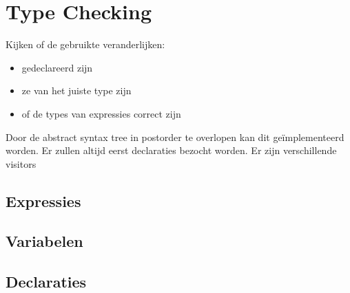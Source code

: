 \section{Type Checking}
Kijken of de gebruikte veranderlijken:
\begin{itemize}
	\item gedeclareerd zijn
	\item ze van het juiste type zijn
	\item of de types van expressies correct zijn
\end{itemize}
Door de abstract syntax tree in postorder te overlopen kan dit geïmplementeerd worden. Er zullen altijd eerst declaraties bezocht worden. Er zijn verschillende visitors 
\subsection{Expressies}

\subsection{Variabelen}

\subsection{Declaraties}

